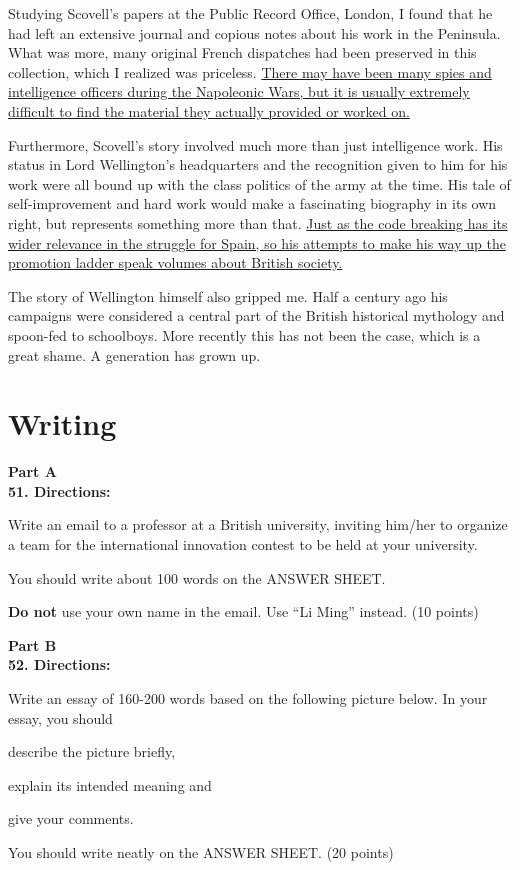 Studying Scovell's papers at the Public Record Office, London, I found
that he had left an extensive journal
and copious notes about his work in the Peninsula. What was more, many
original French dispatches had been
preserved in this collection, which I realized was priceless. \transnum  \uline{There
may have been many spies and intelligence
officers during the Napoleonic Wars, but it is usually extremely
difficult to find the material they actually
provided or worked on.}



Furthermore, Scovell's story involved much more than just intelligence
work. His status in Lord Wellington's
headquarters and the recognition given to him for his work were all
bound up with the class politics of the army at
the time. His tale of self-improvement and hard work would make a
fascinating biography in its own right, but
represents something more than that. \transnum  \uline{Just as the code breaking has
its wider relevance in the struggle for
Spain, so his attempts to make his way up the promotion ladder speak
volumes about British society.}




The story of Wellington himself also gripped me. Half a century ago his
campaigns were considered a central
part of the British historical mythology and spoon-fed to schoolboys.
More recently this has not been the case,
which is a great shame. A generation has grown up.



\newpage
\section{Writing}


\noindent
\textbf{Part A}\\
\textbf{51. Directions:}

Write an email to a professor at a British university, inviting him/her
to organize a team for the international
innovation contest to be held at your university.

You should write about 100 words on the ANSWER SHEET.

\textbf{Do not} use your own name in the email. Use ``Li Ming'' instead. (10
points)


\vspace{2em}

\noindent
\textbf{Part B}\\
\textbf{52. Directions:}

Write an essay of 160-200 words based on the following picture below. In
your essay, you should
\begin{listwrite}
\item 
 describe the picture briefly,

\item 
 explain its intended meaning and

\item 
 give your comments.
\end{listwrite}

You should write neatly on the ANSWER SHEET. (20 points)

\begin{figure}[h!]
	\centering
	
\end{figure}



\checkpagenumber